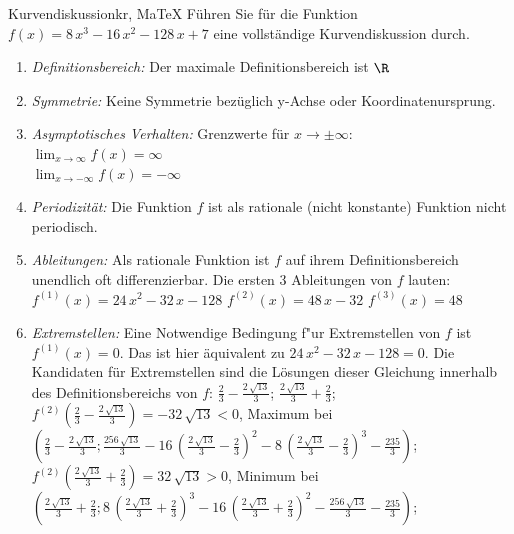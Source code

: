  \providecommand{\MoIl}{(} 
 \providecommand{\MoIr}{)}
 \providecommand{\MIntvlSep}{;} 
 \providecommand{\MElSetSep}{;} 
 \begin{MAufgabe}{Kurvendiskussion}{kr, MaTeX}
 F\"uhren Sie f\"ur die Funktion $f(x)=8\, x^3 - 16\, x^2 - 128\, x + 7$ eine vollst\"andige Kurvendiskussion durch.\\ 
 \ifLsg\Loesung
 \begin{enumerate}
 \item \emph{Definitionsbereich:} 
 Der maximale Definitionsbereich ist $\R$\item \emph{Symmetrie:} 
 Keine Symmetrie bez\"uglich y-Achse oder Koordinatenursprung.\item \emph{Asymptotisches Verhalten:} 
 Grenzwerte f\"ur $x\rightarrow \pm \infty$: \\ 
 $\lim_{x\rightarrow \infty} f(x)=\infty$ \\ 
 $\lim_{x\rightarrow -\infty} f(x)=- \infty$ \\ 
 \item \emph{Periodizit\"at:} 
 Die Funktion $f$ ist als rationale (nicht konstante) Funktion nicht periodisch.\item \emph{Ableitungen:} 
 Als rationale Funktion ist $f$ auf ihrem Definitionsbereich unendlich oft differenzierbar. 
 Die ersten 3 Ableitungen von $f$ lauten: \\ 
 $f^{(1)}(x)=24\, x^2 - 32\, x - 128$\newline 
  $f^{(2)}(x)=48\, x - 32$\newline 
  $f^{(3)}(x)=48$\newline 
  \item \emph{Extremstellen:} 
 Eine Notwendige Bedingung f"ur Extremstellen von $f$ ist $f^{(1)}(x)=0$. 
 Das ist hier \"aquivalent zu $24\, x^2 - 32\, x - 128=0$. 
 Die Kandidaten f\"ur Extremstellen sind die L\"osungen dieser Gleichung innerhalb des Definitionsbereichs von $f$: $\frac{2}{3} - \frac{2\, \sqrt{13}}{3}$; $\frac{2\, \sqrt{13}}{3} + \frac{2}{3}$; \\ 
 $f^{(2)}(\frac{2}{3} - \frac{2\, \sqrt{13}}{3})=- 32\, \sqrt{13}$$<0$, Maximum bei $(\frac{2}{3} - \frac{2\, \sqrt{13}}{3};\frac{256\, \sqrt{13}}{3} - 16\, {\left(\frac{2\, \sqrt{13}}{3} - \frac{2}{3}\right)}^2 - 8\, {\left(\frac{2\, \sqrt{13}}{3} - \frac{2}{3}\right)}^3 - \frac{235}{3})$; \\ 
 $f^{(2)}(\frac{2\, \sqrt{13}}{3} + \frac{2}{3})=32\, \sqrt{13}$$>0$, Minimum bei $(\frac{2\, \sqrt{13}}{3} + \frac{2}{3};8\, {\left(\frac{2\, \sqrt{13}}{3} + \frac{2}{3}\right)}^3 - 16\, {\left(\frac{2\, \sqrt{13}}{3} + \frac{2}{3}\right)}^2 - \frac{256\, \sqrt{13}}{3} - \frac{235}{3})$; \\ 

\end{enumerate}
\end{MAufgabe}
